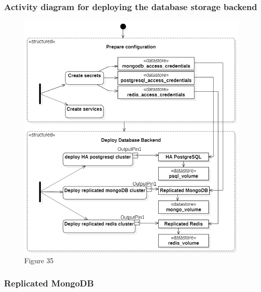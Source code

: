 \subsubsection{Activity diagram for deploying the database storage backend }
\begin{figure}[H]\centering
\includegraphics[width=1.0\textwidth,angle=00]{assets/f35.png}
\caption{Figure 35 }
\label{fig:f35}
\end{figure}

\subsubsection{Replicated MongoDB }

